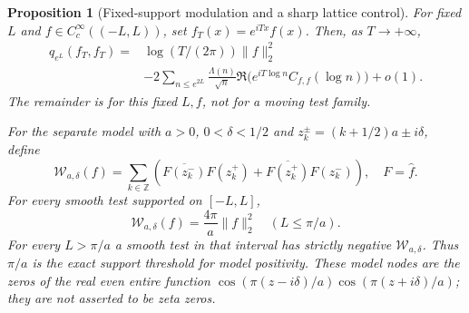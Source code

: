 \documentclass[11pt]{article}
\newtheorem{proposition}[theorem]{Proposition}
\theoremstyle{remark}\newtheorem{remark}[theorem]{Remark}
\newcommand{\Z}{\mathbb Z}
\begin{document}
\begin{proposition}[Fixed-support modulation and a sharp lattice control]
\label{prop:shifted-lattice}
For fixed $L$ and $f\in C_c^\infty((-L,L))$, set
$f_T(x)=e^{iTx}f(x)$. Then, as $T\to+\infty$,
\[
 \begin{split}
 q_{e^L}(f_T,f_T)
  ={}&\log(T/(2\pi))\|f\|_2^2\\
    &-2\sum_{n\le e^{2L}}\frac{\Lambda(n)}{\sqrt n}
          \Re\bigl(e^{iT\log n}C_{f,f}(\log n)\bigr)+o(1).
 \end{split}                                                \tag{FM}
\]
The remainder is for this fixed $L,f$, not for a moving test family.

For the separate model with $a>0$, $0<\delta<1/2$ and
$z_k^\pm=(k+1/2)a\pm i\delta$, define
\[
 \mathcal W_{a,\delta}(f)=\sum_{k\in\Z}
  \left(\overline{F(z_k^-)}F(z_k^+)
              +\overline{F(z_k^+)}F(z_k^-)\right),
 \quad F=\widehat f.
\]
For every smooth test supported on $[-L,L]$,
\[
 \mathcal W_{a,\delta}(f)=\frac{4\pi}{a}\|f\|_2^2
                                    \quad(L\le\pi/a). \tag{LP}
\]
For every $L>\pi/a$ a smooth test in that interval has
strictly negative $\mathcal W_{a,\delta}$. Thus $\pi/a$
is the exact support threshold for model positivity.
These model nodes are the zeros of the real even entire function
$\cos(\pi(z-i\delta)/a)\cos(\pi(z+i\delta)/a)$;
they are not asserted to be zeta zeros.
\end{proposition}
\end{document}
